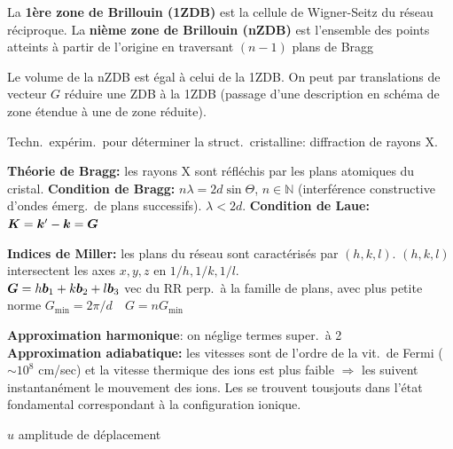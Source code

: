 \begin{squishlist}
    \item La \textbf{1ère zone de Brillouin (1ZDB)} est la cellule de Wigner-Seitz du réseau réciproque. La \textbf{nième zone de Brillouin (nZDB)} est l'ensemble des points atteints à partir de l'origine en traversant $(n-1)$ plans de Bragg
    \item Le volume de la nZDB est égal à celui de la 1ZDB. On peut par translations de vecteur $G$ réduire une ZDB à la 1ZDB (passage d'une description en schéma de zone étendue à une de zone réduite).
\end{squishlist}

Techn.\ expérim.\ pour déterminer la struct.\ cristalline: diffraction de rayons X.
\begin{squishlist}
    \item \textbf{Théorie de Bragg:} les rayons X sont réfléchis par les plans atomiques du cristal. \textbf{Condition de Bragg:} $n \lambda = 2d \sin \Theta$, $n \in \mathbb{N}$ (interférence constructive d'ondes émerg.\ de plans successifs). $\lambda < 2d$. \quad
    \textbf{Condition de Laue:} $\bm{K} = \bm{k}'-\bm{k} = \bm{G}$

    \item \textbf{Indices de Miller:} les plans du réseau sont caractérisés par $(h,k,l)$. $(h,k,l)$ intersectent les axes $x,y,z$ en $1/h,1/k,1/l$.\\
    $\bm{G} = h \bm{b}_1 + k \bm{b}_2 + l \bm{b}_3$ vec du RR perp.\ à la famille de plans, avec plus petite norme $G_{\min} = 2\pi / d \quad G = n G_{\min}$
\end{squishlist}

\begin{squishlist}
    \item \textbf{Approximation harmonique}: on néglige termes super.\ à 2
    \\ \textbf{Approximation adiabatique:} les vitesses \elec sont de l'ordre de la vit.\ de Fermi ($\sim 10^8$ cm/sec) et la vitesse thermique des ions est plus faible $\Rightarrow$ les \elec suivent instantanément le mouvement des ions. Les \elec se trouvent tousjouts dans l'état fondamental correspondant à la configuration ionique.
    \item $u$ amplitude de déplacement
\end{squishlist}

